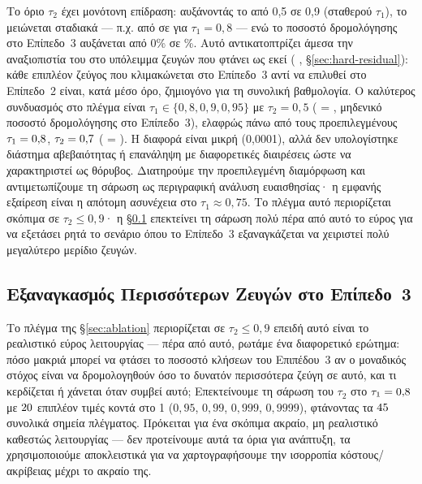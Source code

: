 Το όριο $\tau_2$ έχει μονότονη επίδραση: αυξάνοντάς το από 0{,}5 σε 0{,}9 (σταθερού
$\tau_1$), το  μειώνεται σταδιακά --- π.χ. από \AblBestFone{} σε \AblHighTauOneLowFone{} για
$\tau_1 = 0{,}8$ --- ενώ το ποσοστό δρομολόγησης στο Επίπεδο~3 αυξάνεται από 0\% σε \AblTauTwoMaxTierThreePct\%.
Αυτό αντικατοπτρίζει άμεσα την αναξιοπιστία του \texttt{} στο
υπόλειμμα ζευγών που φτάνει ως εκεί ( \TierThreeFone, \S\ref{sec:hard-residual}):
κάθε επιπλέον ζεύγος που κλιμακώνεται στο Επίπεδο~3 αντί να επιλυθεί στο Επίπεδο~2
είναι, κατά μέσο όρο, ζημιογόνο για τη συνολική βαθμολογία.
Ο καλύτερος συνδυασμός στο
πλέγμα είναι $\tau_1 \in \{0{,}8, 0{,}9, 0{,}95\}$ με $\tau_2 = 0{,}5$
( = \AblBestFone{}, μηδενικό ποσοστό δρομολόγησης στο Επίπεδο~3), ελαφρώς πάνω από τους
προεπιλεγμένους $\tau_1 = 0{,}8$, $\tau_2 = 0{,}7$ ( = \AblDefaultFone{}). Η
διαφορά είναι μικρή (0{,}0001), αλλά δεν υπολογίστηκε διάστημα αβεβαιότητας ή
επανάληψη με διαφορετικές διαιρέσεις ώστε να χαρακτηριστεί ως θόρυβος.
Διατηρούμε
την προεπιλεγμένη διαμόρφωση και αντιμετωπίζουμε τη σάρωση ως περιγραφική ανάλυση
ευαισθησίας· η εμφανής εξαίρεση είναι η απότομη ασυνέχεια στο
$\tau_1 \approx 0{,}75$.
Το πλέγμα αυτό περιορίζεται σκόπιμα σε $\tau_2 \leq 0{,}9$· η \S\ref{subsec:force-tier3} επεκτείνει
τη σάρωση πολύ πέρα από αυτό το εύρος για να εξετάσει ρητά το σενάριο όπου το Επίπεδο~3
εξαναγκάζεται να χειριστεί πολύ μεγαλύτερο μερίδιο ζευγών.

\subsection[Εξαναγκασμός Περισσότερων Ζευγών στο Επίπεδο 3]{Εξαναγκασμός Περισσότερων Ζευγών στο Επίπεδο~3}
\label{subsec:force-tier3}

Το πλέγμα της \S\ref{sec:ablation} περιορίζεται σε $\tau_2 \leq 0{,}9$ επειδή αυτό είναι
το ρεαλιστικό εύρος λειτουργίας --- πέρα από αυτό, ρωτάμε ένα διαφορετικό ερώτημα: πόσο
μακριά μπορεί να φτάσει το ποσοστό κλήσεων του Επιπέδου~3 αν ο μοναδικός στόχος είναι να
δρομολογηθούν όσο το δυνατόν περισσότερα ζεύγη σε αυτό, και τι κερδίζεται ή χάνεται όταν
συμβεί αυτό; Επεκτείνουμε τη σάρωση του $\tau_2$ στο $\tau_1 = 0{,}8$ με
$20{}$ επιπλέον τιμές κοντά στο 1 ($0{,}95$, $0{,}99$, $0{,}999$,
$0{,}9999$), φτάνοντας τα $45{}$ συνολικά σημεία πλέγματος.
Πρόκειται
για ένα σκόπιμα ακραίο, μη ρεαλιστικό καθεστώς λειτουργίας --- δεν προτείνουμε αυτά τα
όρια για ανάπτυξη, τα χρησιμοποιούμε αποκλειστικά για να χαρτογραφήσουμε την ισορροπία
κόστους/ακρίβειας μέχρι το ακραίο της.

